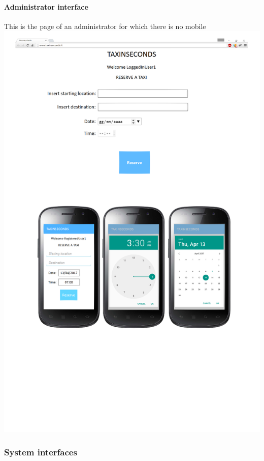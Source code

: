 \documentclass{article}
\begin{document}
\paragraph{Administrator interface}
This is the page of an administrator for which there is no mobile 
\includegraphics{Reserve a taxi}
\clearpage
\subsubsection{System interfaces}
 %
\end{document}
